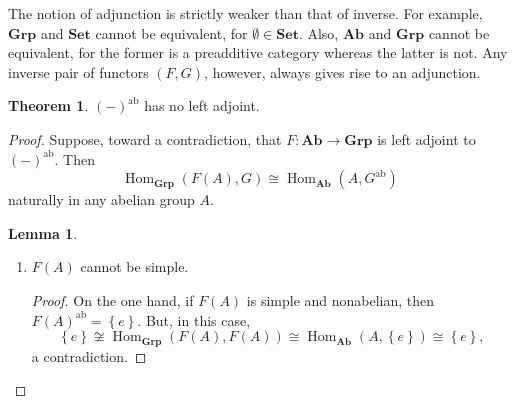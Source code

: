 \documentclass[10pt,letterpaper,cm]{nupset}
\theoremstyle{definition}
\theoremstyle{theorem}
\newtheorem{theorem}[definition]{Theorem}
\newtheorem{lemma}[definition]{Lemma}
\theoremstyle{remark}
\newcommand{\1}{\mathbf{1}}
\newcommand{\0}{\vec 0}
\DeclareMathOperator{\ab}{ab}
\DeclareMathOperator{\Hom}{Hom}
\begin{document}
The notion of adjunction is strictly weaker than that of inverse. For example, $\mathbf{Grp}$ and $\mathbf{Set}$ cannot be equivalent, for $\emptyset \in \mathbf{Set}$. Also, $\mathbf{Ab}$ and $\mathbf{Grp}$ cannot be equivalent, for the former is a preadditive category whereas the latter is not.
Any inverse pair of functors $\left(F, G\right)$, however, always gives rise to an adjunction.


\begin{theorem}
$\left({-}\right)^{\ab}$ has no left adjoint.
\end{theorem}
\begin{proof}
Suppose, toward a contradiction, that $F: \mathbf{Ab} \to \mathbf{Grp}$ is  left adjoint to $\left({-}\right)^{\ab}$. Then $$\Hom_{\mathbf{Grp}}(F(A), G) \cong \Hom_{\mathbf{Ab}}(A, G^{\ab})$$ naturally in any abelian group $A$.
\begin{lemma}\label{LL} $ $
\begin{enumerate}[label=(\alph*)]
\item $F(A)$ cannot be simple.
\begin{proof}
On the one hand, if $F(A)$ is simple and nonabelian, then $F(A)^{\ab} =\left\{e\right\}$. But, in this case, $$\left\{e\right\} \not \cong \Hom_{\mathbf{Grp}}(F(A), F(A)) \cong \Hom_{\mathbf{Ab}}(A, \left\{e\right\})\cong \left\{e\right\},$$ a contradiction.


\end{proof}
\end{enumerate}
\end{lemma}
\end{proof}
\end{document}
